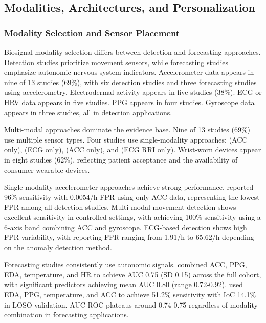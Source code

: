 \subsection{Modalities, Architectures, and Personalization}

\subsubsection{Modality Selection and Sensor Placement}

Biosignal modality selection differs between detection and forecasting approaches. Detection studies prioritize movement sensors, while forecasting studies emphasize autonomic nervous system indicators. Accelerometer data appears in nine of 13 studies (69\%), with six detection studies and three forecasting studies using accelerometry. Electrodermal activity appears in five studies (38\%). ECG or HRV data appears in five studies. PPG appears in four studies. Gyroscope data appears in three studies, all in detection applications.

Multi-modal approaches dominate the evidence base. Nine of 13 studies (69\%) use multiple sensor types. Four studies use single-modality approaches: \textcite{spahrDeepLearningbasedDetection2025} (ACC only), \textcite{reintjesECGBasedDetectionEpileptic2025} (ECG only), \textcite{borujenyDetectionEpilepticSeizure2013} (ACC only), and \textcite{odeDevelopmentEpilepticSeizure2023} (ECG RRI only). Wrist-worn devices appear in eight studies (62\%), reflecting patient acceptance and the availability of consumer wearable devices.

Single-modality accelerometer approaches achieve strong performance. \textcite{spahrDeepLearningbasedDetection2025} reported 96\% sensitivity with 0.0054/h FPR using only ACC data, representing the lowest FPR among all detection studies. Multi-modal movement detection shows excellent sensitivity in controlled settings, with \textcite{fineDetectionKeyAutomated2025} achieving 100\% sensitivity using a 6-axis band combining ACC and gyroscope. ECG-based detection shows high FPR variability, with \textcite{reintjesECGBasedDetectionEpileptic2025} reporting FPR ranging from 1.91/h to 65.62/h depending on the anomaly detection method.

Forecasting studies consistently use autonomic signals. \textcite{nasseriAmbulatorySeizureForecasting2021} combined ACC, PPG, EDA, temperature, and HR to achieve AUC 0.75 (SD 0.15) across the full cohort, with significant predictors achieving mean AUC 0.80 (range 0.72-0.92). \textcite{meiselMachineLearningWristband2020} used EDA, PPG, temperature, and ACC to achieve 51.2\% sensitivity with IoC 14.1\% in LOSO validation. AUC-ROC plateaus around 0.74-0.75 regardless of modality combination in forecasting applications.


